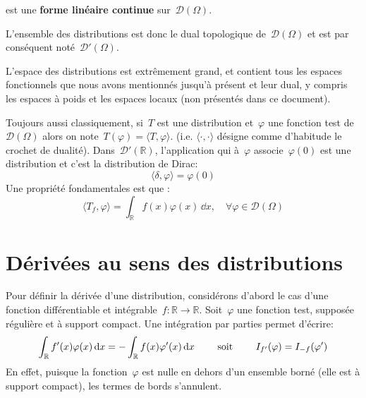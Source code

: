 \medskip
\begin{definition}[Distribution]
 est une \textbf{forme linéaire continue} sur~$\mathcal{D}(\Omega)$.
\end{definition}

L'ensemble des distributions est donc le dual topologique de~$\mathcal{D}(\Omega)$ et est par conséquent noté~$\mathcal{D}'(\Omega)$.
\begin{remarque}
L'espace des distributions est extrêmement grand, et contient tous les espaces fonctionnels que nous avons mentionnés jusqu'à présent et leur dual, y compris les espaces à poids et les espaces locaux (non présentés dans ce document).
\end{remarque}
Toujours aussi classiquement, si~$T$ est une distribution et~$\varphi$ une fonction test de $\mathcal{D}(\Omega)$ alors on note~$T(\varphi)=\langle T,\varphi \rangle$. (i.e. $\langle\cdot,\cdot\rangle$ désigne comme d'habitude le crochet de dualité).
\medskipvm
Dans~$\mathcal{D}'(\mathbb{R})$, l'application qui à~$\varphi$ associe~$\varphi(0)$ est une distribution et c'est la distribution de Dirac:
\begin{equation}
\langle\delta,\varphi\rangle=\varphi(0)
\end{equation}
\medskipvm
Une propriété fondamentales est que :
\begin{equation}
  \langle T_f,\varphi\rangle=\int_{\mathbb{R}}f(x)\varphi(x)\,\dd x, \quad \forall \varphi\in\mathcal{D}(\Omega)
\end{equation}


\medskip
\section{Dérivées au sens des distributions}
Pour définir la dérivée d'une distribution, considérons d'abord le cas d'une fonction différentiable et intégrable~$f:\mathbb{R}\rightarrow\mathbb{R}$.
Soit~$\varphi$ une fonction test, supposée régulière et à support compact.
Une intégration par parties permet d'écrire:
\begin{equation}
  \int_{\mathbb R} f'(x) \varphi(x)\,\text{d} x = -\int_{\mathbb R} f(x)\varphi'(x)\,\text{d} x \qquad\text{ soit }\qquad I_{f'}(\varphi)=I_{-f}(\varphi')
\end{equation}
En effet, puisque la fonction~$\varphi$ est nulle en dehors d'un ensemble borné (elle est à support compact), les termes de bords s'annulent.

